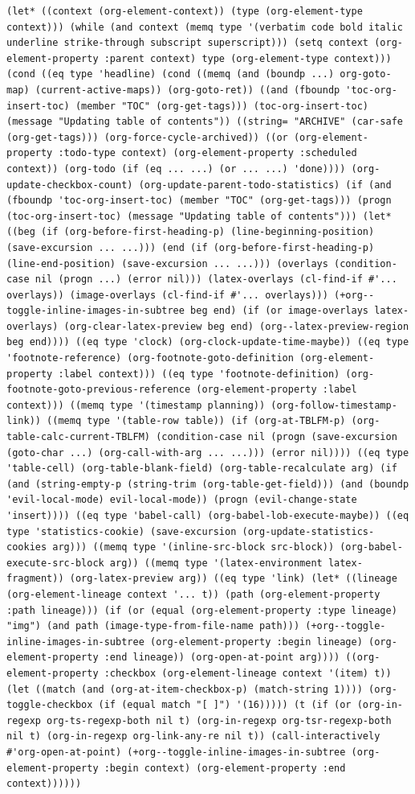 \documentclass[11pt]{article}
\begin{document}
\begin{enumerate}
\begin{verbatim}
(let* ((context (org-element-context)) (type (org-element-type context))) (while (and context (memq type '(verbatim code bold italic underline strike-through subscript superscript))) (setq context (org-element-property :parent context) type (org-element-type context))) (cond ((eq type 'headline) (cond ((memq (and (boundp ...) org-goto-map) (current-active-maps)) (org-goto-ret)) ((and (fboundp 'toc-org-insert-toc) (member "TOC" (org-get-tags))) (toc-org-insert-toc) (message "Updating table of contents")) ((string= "ARCHIVE" (car-safe (org-get-tags))) (org-force-cycle-archived)) ((or (org-element-property :todo-type context) (org-element-property :scheduled context)) (org-todo (if (eq ... ...) (or ... ...) 'done)))) (org-update-checkbox-count) (org-update-parent-todo-statistics) (if (and (fboundp 'toc-org-insert-toc) (member "TOC" (org-get-tags))) (progn (toc-org-insert-toc) (message "Updating table of contents"))) (let* ((beg (if (org-before-first-heading-p) (line-beginning-position) (save-excursion ... ...))) (end (if (org-before-first-heading-p) (line-end-position) (save-excursion ... ...))) (overlays (condition-case nil (progn ...) (error nil))) (latex-overlays (cl-find-if #'... overlays)) (image-overlays (cl-find-if #'... overlays))) (+org--toggle-inline-images-in-subtree beg end) (if (or image-overlays latex-overlays) (org-clear-latex-preview beg end) (org--latex-preview-region beg end)))) ((eq type 'clock) (org-clock-update-time-maybe)) ((eq type 'footnote-reference) (org-footnote-goto-definition (org-element-property :label context))) ((eq type 'footnote-definition) (org-footnote-goto-previous-reference (org-element-property :label context))) ((memq type '(timestamp planning)) (org-follow-timestamp-link)) ((memq type '(table-row table)) (if (org-at-TBLFM-p) (org-table-calc-current-TBLFM) (condition-case nil (progn (save-excursion (goto-char ...) (org-call-with-arg ... ...))) (error nil)))) ((eq type 'table-cell) (org-table-blank-field) (org-table-recalculate arg) (if (and (string-empty-p (string-trim (org-table-get-field))) (and (boundp 'evil-local-mode) evil-local-mode)) (progn (evil-change-state 'insert)))) ((eq type 'babel-call) (org-babel-lob-execute-maybe)) ((eq type 'statistics-cookie) (save-excursion (org-update-statistics-cookies arg))) ((memq type '(inline-src-block src-block)) (org-babel-execute-src-block arg)) ((memq type '(latex-environment latex-fragment)) (org-latex-preview arg)) ((eq type 'link) (let* ((lineage (org-element-lineage context '... t)) (path (org-element-property :path lineage))) (if (or (equal (org-element-property :type lineage) "img") (and path (image-type-from-file-name path))) (+org--toggle-inline-images-in-subtree (org-element-property :begin lineage) (org-element-property :end lineage)) (org-open-at-point arg)))) ((org-element-property :checkbox (org-element-lineage context '(item) t)) (let ((match (and (org-at-item-checkbox-p) (match-string 1)))) (org-toggle-checkbox (if (equal match "[ ]") '(16))))) (t (if (or (org-in-regexp org-ts-regexp-both nil t) (org-in-regexp org-tsr-regexp-both nil t) (org-in-regexp org-link-any-re nil t)) (call-interactively #'org-open-at-point) (+org--toggle-inline-images-in-subtree (org-element-property :begin context) (org-element-property :end context))))))

\end{verbatim}
\end{enumerate}
\end{document}
